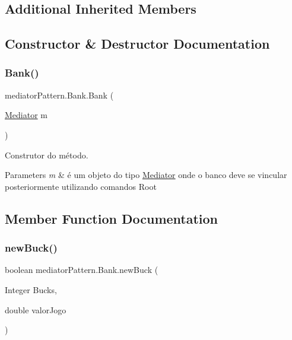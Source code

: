 \subsection*{Additional Inherited Members}


\subsection{Constructor \& Destructor Documentation}
\mbox{\label{classmediator_pattern_1_1_bank_ae4ad12d1d757ea70252a43b77278e2f7}} 
\subsubsection{\texorpdfstring{Bank()}{Bank()}}
{\footnotesize\ttfamily mediator\+Pattern.\+Bank.\+Bank (\begin{DoxyParamCaption}\item[{\mbox{\hyperlink{interfacemediator_pattern_1_1_mediator}{Mediator}}}]{m }\end{DoxyParamCaption})}



Construtor do método. 


\begin{DoxyParams}{Parameters}
{\em m} & é um objeto do tipo \mbox{\hyperlink{interfacemediator_pattern_1_1_mediator}{Mediator}} onde o banco deve se vincular posteriormente utilizando comandos Root \\
\hline
\end{DoxyParams}


\subsection{Member Function Documentation}
\mbox{\label{classmediator_pattern_1_1_bank_afe945c98e30b089256042309b907154d}} 
\subsubsection{\texorpdfstring{newBuck()}{newBuck()}}
{\footnotesize\ttfamily boolean mediator\+Pattern.\+Bank.\+new\+Buck (\begin{DoxyParamCaption}\item[{Integer}]{Bucks,  }\item[{double}]{valor\+Jogo }\end{DoxyParamCaption})}



